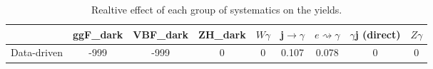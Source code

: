 \documentclass[10pt]{article}
\begin{document}
\begin{table}[htbp]
\begin{center}
\begin{tabular}{|c|c|c|c|c|c|c|c|c|}
\hline 
      & ggF_{dark}      & VBF_{dark}      & ZH_{dark}      & $W\gamma$      & j$\rightarrow\gamma$      & $e\rightsquigarrow\gamma$      & $\gamma$j (direct)      & $Z\gamma$ \\ 
\hline 
 Data-driven & -999 & -999 & 0 & 0 & 0.107 & 0.078 & 0 & 0 \\ 
\hline 
\end{tabular} 
\caption{Realtive effect of each group of systematics on the yields.} 
\end{center} 
\end{table} 
\end{document}

